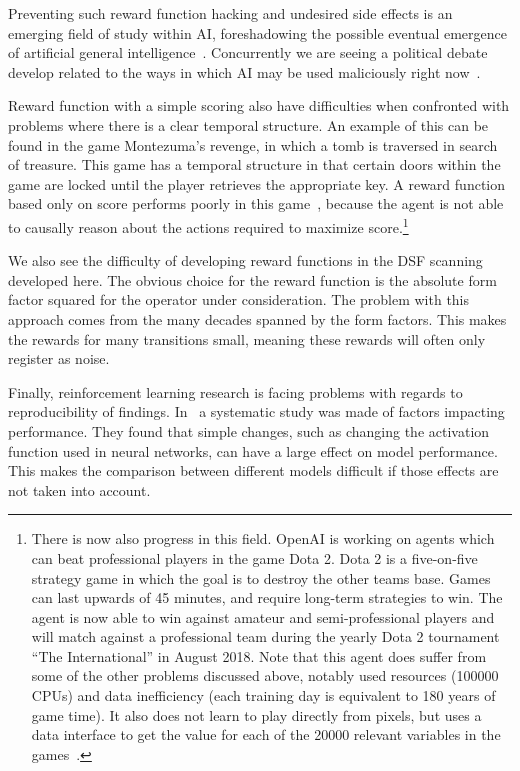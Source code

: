 \documentclass[11pt, a4paper]{report} %
\begin{document}
Preventing such reward function hacking and undesired side effects is an emerging field of study within AI, foreshadowing the possible eventual emergence of artificial general intelligence~\cite{amodei16_concr_probl_ai_safet}.
Concurrently we are seeing a political debate develop related to the ways in which AI may be used maliciously right now~\cite{brundage18_malic_use_artif_intel}.

Reward function with a simple scoring also have difficulties when confronted with problems where there is a clear temporal structure.
An example of this can be found in the game Montezuma's revenge, in which a tomb is traversed in search of treasure.
This game has a temporal structure in that certain doors within the game are locked until the player retrieves the appropriate key.
A reward function based only on score performs poorly in this game~\cite{mnih15_human_level_contr_throug_deep_reinf_learn}, because the agent is not able to causally reason about the actions required to maximize score.\footnote{There is now also progress in this field. OpenAI is working on agents which can beat professional players in the game Dota 2. Dota 2 is a five-on-five strategy game in which the goal is to destroy the other teams base. Games can last upwards of 45 minutes, and require long-term strategies to win. The agent is now able to win against amateur and semi-professional players and will match against a professional team during the yearly Dota 2 tournament ``The International'' in August 2018. Note that this agent does suffer from some of the other problems discussed above, notably used resources (100000 CPUs) and data inefficiency (each training day is equivalent to 180 years of game time). It also does not learn to play directly from pixels, but uses a data interface to get the value for each of the 20000 relevant variables in the games~\cite{OpenAIDota}.}

We also see the difficulty of developing reward functions in the DSF scanning developed here.
The obvious choice for the reward function is the absolute form factor squared for the operator under consideration.
The problem with this approach comes from the many decades spanned by the form factors.
This makes the rewards for many transitions small, meaning these rewards will often only register as noise.

Finally, reinforcement learning research is facing problems with regards to reproducibility of findings.
In~\cite{1709.06560} a systematic study was made of factors impacting performance.
They found that simple changes, such as changing the activation function used in neural networks, can have a large effect on model performance.
This makes the comparison between different models difficult if those effects are not taken into account.
\end{document}
